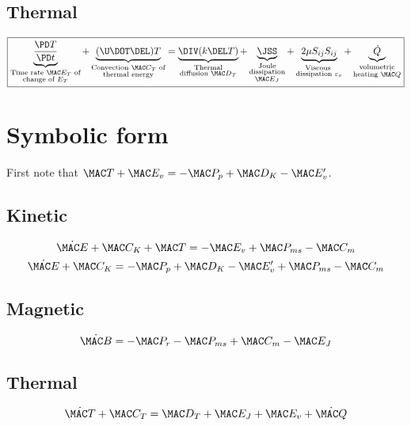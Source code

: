 \documentclass[11pt]{article}
\begin{document}
\subsection{Thermal}
\begin{equation}
	\boxed{
	\underbrace{\frac{\PD T}{\PD t}}_{\substack{\text{Time rate $\MAC E_T$ of} \\ \text{change of $E_T$}}} +
	\underbrace{(\U \DOT \DEL) T}_{\substack{\text{Convection $\MAC C_T$ of} \\ \text{thermal energy}}}
	=
	\underbrace{\DIV (k \DEL T)}_{\substack{\text{Thermal} \\ \text{diffusion } \MAC D_T}} +
	\underbrace{\JSS}_
	{\substack{\text{Joule}\\\text{dissipation}\\\text{$\MAC E_J$}}} +
	\underbrace{2 \mu S_{ij}S_{ij}}_{\substack{\text{Viscous } \\ \text{dissipation } \varepsilon_v}} +
	\underbrace{\dot{Q}}_{\substack{\text{volumetric} \\ \text{heating } \dot{\MAC Q}}}
	}
\end{equation}

\section{Symbolic form}
First note that $\MAC T + \MAC E_v = -\MAC P_p + \MAC D_K - \MAC E_v'$.
\subsection{Kinetic}
\begin{equation}
	\dot{\MAC E} + \MAC C_K + \MAC T = - \MAC E_v + \MAC P_{ms} - \MAC C_m
\end{equation}
\begin{equation}
	\dot{\MAC E} + \MAC C_K = -\MAC P_p + \MAC D_K - \MAC E_v' + \MAC P_{ms} - \MAC C_m
\end{equation}
\subsection{Magnetic}
\begin{equation}
	\dot{\MAC B} = -\MAC P_r - \MAC P_{ms} + \MAC C_m - \MAC E_J
\end{equation}
\subsection{Thermal}
\begin{equation}
	\dot{\MAC T} + \MAC C_T = \MAC D_T + \MAC E_J + \MAC E_v + \dot{\MAC Q}
\end{equation}
\end{document}
